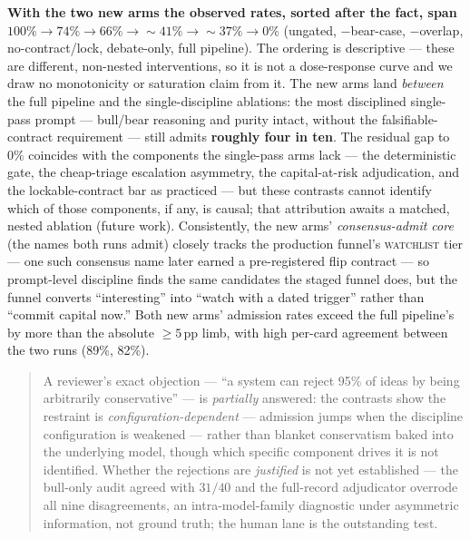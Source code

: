 \documentclass[11pt]{article}
\begin{document}
\textbf{With the two new arms the observed rates, sorted after the fact, span $100\% \to 74\% \to
66\% \to {\sim}41\% \to {\sim}37\% \to 0\%$} (ungated, $-$bear-case, $-$overlap, no-contract/lock,
debate-only, full pipeline). The ordering is descriptive --- these are different, non-nested
interventions, so it is not a dose-response curve and we draw no monotonicity or saturation claim
from it. The new arms land \emph{between} the full pipeline and the
single-discipline ablations: the most disciplined single-pass prompt --- bull/bear
reasoning and purity intact, without the falsifiable-contract requirement --- still admits
\textbf{roughly
four in ten}. The residual gap to $0\%$ coincides with the components the single-pass arms lack ---
the deterministic gate, the cheap-triage escalation
asymmetry, the capital-at-risk adjudication, and the lockable-contract bar as practiced --- but
these contrasts cannot identify which of those components, if any, is causal; that attribution
awaits a matched, nested ablation (future work).
Consistently, the new arms' \emph{consensus-admit core} (the names both
runs admit) closely tracks the production funnel's \textsc{watchlist} tier --- one
such consensus name later earned a pre-registered flip contract --- so prompt-level
discipline finds the same candidates the staged funnel does, but the funnel converts
``interesting'' into ``watch with a dated trigger'' rather than ``commit capital now.''
Both new arms' admission rates exceed the full pipeline's by more than the absolute $\geq 5$\,pp
limb, with high per-card agreement between the two runs (89\%, 82\%).

\begin{quote}
A reviewer's exact objection --- ``a system can reject 95\% of ideas by being
arbitrarily conservative'' --- is \emph{partially} answered: the
contrasts show the restraint is \emph{configuration-dependent} --- admission jumps when the
discipline configuration is weakened --- rather than blanket conservatism baked into the
underlying model, though which specific component drives it is not identified. Whether the
rejections are \emph{justified} is not yet established --- the
bull-only audit agreed with $31/40$ and the full-record adjudicator overrode all nine disagreements,
an intra-model-family diagnostic under asymmetric information, not ground truth; the human lane is
the outstanding test.
\end{quote}
\end{document}
